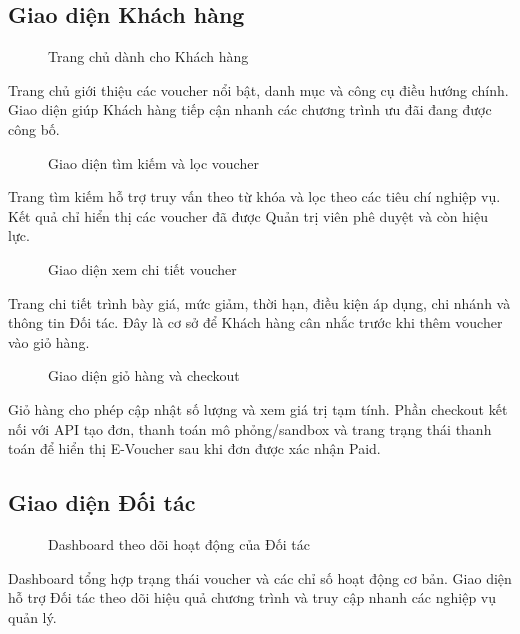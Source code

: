 \subsection{Giao diện Khách hàng}

\begin{figure}[H]
\centering
{}
\caption{Trang chủ dành cho Khách hàng}
\end{figure}
Trang chủ giới thiệu các voucher nổi bật, danh mục và công cụ điều hướng chính. Giao diện giúp Khách hàng tiếp cận nhanh các chương trình ưu đãi đang được công bố.

\begin{figure}[H]
\centering
{}
\caption{Giao diện tìm kiếm và lọc voucher}
\end{figure}
Trang tìm kiếm hỗ trợ truy vấn theo từ khóa và lọc theo các tiêu chí nghiệp vụ. Kết quả chỉ hiển thị các voucher đã được Quản trị viên phê duyệt và còn hiệu lực.

\begin{figure}[H]
\centering
{}
\caption{Giao diện xem chi tiết voucher}
\end{figure}
Trang chi tiết trình bày giá, mức giảm, thời hạn, điều kiện áp dụng, chi nhánh và thông tin Đối tác. Đây là cơ sở để Khách hàng cân nhắc trước khi thêm voucher vào giỏ hàng.

\begin{figure}[H]
\centering
{}
\caption{Giao diện giỏ hàng và checkout}
\end{figure}
Giỏ hàng cho phép cập nhật số lượng và xem giá trị tạm tính. Phần checkout kết nối với API tạo đơn, thanh toán mô phỏng/sandbox và trang trạng thái thanh toán để hiển thị E-Voucher sau khi đơn được xác nhận Paid.

\subsection{Giao diện Đối tác}

\begin{figure}[H]
\centering
{}
\caption{Dashboard theo dõi hoạt động của Đối tác}
\end{figure}
Dashboard tổng hợp trạng thái voucher và các chỉ số hoạt động cơ bản. Giao diện hỗ trợ Đối tác theo dõi hiệu quả chương trình và truy cập nhanh các nghiệp vụ quản lý.

